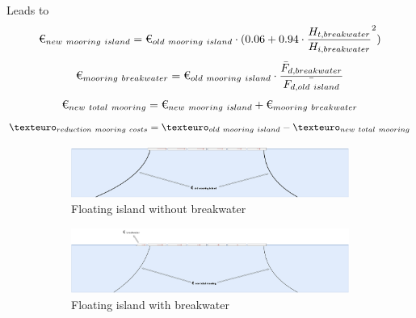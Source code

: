 
Leads to
\begin{equation}
    \text{\texteuro}_{new~mooring~island} =  \text{\texteuro}_{old~mooring~island} \cdot (0.06+ 0.94\cdot \frac{H_{t,breakwater}}{H_{i,breakwater}}^2)
    \label{eq: new mooring island costs}
\end{equation}
\begin{equation}
    \text{\texteuro}_{mooring~breakwater} = \text{\texteuro}_{old~mooring~island} \cdot \frac{\bar{F}_{d, breakwater}}{\bar{F_{d, old~island}}}\\
    \label{eq: mooring costs breakwater}
\end{equation}
\begin{equation}
    \text{\texteuro}_{new~total~mooring} = \text{\texteuro}_{new~mooring~island} + \text{\texteuro}_{mooring~breakwater}
    \label{eq: total mooring costs}
\end{equation}
\begin{equation}
    \texteuro_{reduction~mooring~costs}  = \texteuro_{old~mooring~island}- \texteuro_{new~total~mooring}
    \label{eq: reduction mooring costs}
\end{equation}





\begin{figure}[h]
 
    \centering
    \begin{subfigure}[b]{0.99\textwidth}
        \centering
        \includegraphics[width=\linewidth]{figures/Methodology/floatingisland_oldmooring.pdf} 
        \caption[]%
        {{\small Floating island without breakwater}}    
        \label{fig: old floating island cost function}
    \end{subfigure}

    \centering
    \begin{subfigure}[b]{0.99\textwidth}  
        \centering 
        \includegraphics[width=\linewidth]{figures/Methodology/floatingisland_newmooring.pdf}
        \caption[]%
        {{\small Floating island with breakwater}}    
        \label{fig: new floating island cost function}
    \end{subfigure}



    \caption{}
    \label{fig: }
\end{figure}





